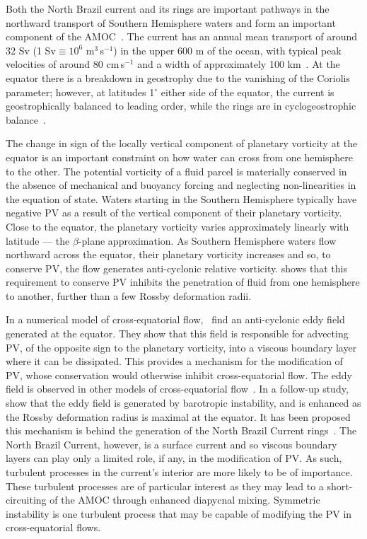 Both the North Brazil current and its rings are important pathways in the northward transport of Southern Hemisphere waters and form an important component of the AMOC~\citep{Bower2019}. The current has an annual mean transport of around 32 Sv (1 Sv$\equiv 10^{6}$ m$^3$\,s$^{-1}$) in the upper 600 m of the ocean, with typical peak velocities of around 80 cm\,s$^{-1}$ and a width of approximately 100 km~\citep{Johns1998, Schott1993}. At the equator there is a breakdown in geostrophy due to the vanishing of the Coriolis parameter; however, at latitudes 1$^\circ$ either side of the equator, the current is geostrophically balanced to leading order, while the rings are in cyclogeostrophic balance~\citep{Vianna2003, Castelao2011}.

The change in sign of the locally vertical component of planetary vorticity at the equator is an important constraint on how water can cross from one hemisphere to the other. The potential vorticity of a fluid parcel is materially conserved in the absence of mechanical and buoyancy forcing and neglecting non-linearities in the equation of state. Waters starting in the Southern Hemisphere typically have negative PV as a result of the vertical component of their planetary vorticity. Close to the equator, the planetary vorticity varies approximately linearly with latitude --- the $\beta$-plane approximation. As Southern Hemisphere waters flow northward across the equator, their planetary vorticity increases and so, to conserve PV, the flow generates anti-cyclonic relative vorticity. \citet{Killworth1991} shows that this requirement to conserve PV inhibits the penetration of fluid from one hemisphere to another, further than a few Rossby deformation radii.

In a numerical model of cross-equatorial flow,~\citet{Edwards1998I} find an anti-cyclonic eddy field generated at the equator. They show that this field is responsible for advecting PV, of the opposite sign to the planetary vorticity, into a viscous boundary layer where it can be dissipated. This provides a mechanism for the modification of PV, whose conservation would otherwise inhibit cross-equatorial flow. The eddy field is observed in other models of cross-equatorial flow~\citep[e.g.][]{Jochum2003, Goes2009}. In a follow-up study,~\citet{Edwards1998II} show that the eddy field is generated by barotropic instability, and is enhanced as the Rossby deformation radius is maximal at the equator. It has been proposed this mechanism is behind the generation of the North Brazil Current rings~\citep{Jochum2003}. The North Brazil Current, however, is a surface current and so viscous boundary layers can play only a limited role, if any, in the modification of PV. As such, turbulent processes in the current's interior are more likely to be of importance. These turbulent processes are of particular interest as they may lead to a short-circuiting of the AMOC through enhanced diapycnal mixing. Symmetric instability is one turbulent process that may be capable of modifying the PV in cross-equatorial flows.

